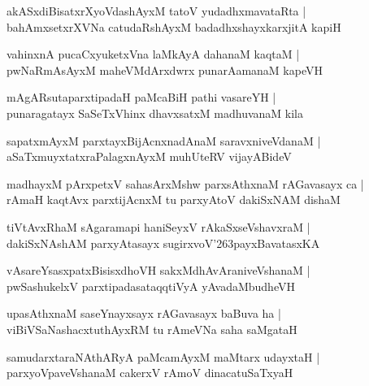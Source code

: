 \documentclass[twoside,12pt,openright]{book}
\def\S{\char'263}
\newcounter{shloka}[chapter]
\begin{document}
\begin{shloka}%
akASxdiBisatxrXyoVdashAyxM tatoV yudadhxmavataRta |\\
bahAmxsetxrXVNa catudaRshAyxM badadhxshayxkarxjitA kapiH 
\end{shloka}

\begin{shloka}%
vahinxnA pucaCxyuketxVna laMkAyA dahanaM kaqtaM |\\
pwNaRmAsAyxM maheVMdArxdwrx punarAamanaM kapeVH 
\end{shloka}

\begin{shloka}%
mAgARsutaparxtipadaH paMcaBiH pathi vasareYH |\\
punaragatayx SaSeTxVhinx dhavxsatxM madhuvanaM kila 
\end{shloka}

\begin{shloka}%
sapatxmAyxM parxtayxBijAcnxnadAnaM saravxniveVdanaM |\\
aSaTxmuyxtatxraPalagxnAyxM muhUteRV vijayABideV 
\end{shloka}

\begin{shloka}%
madhayxM pArxpetxV sahasArxMshw parxsAthxnaM rAGavasayx ca |\\
rAmaH kaqtAvx parxtijAcnxM tu parxyAtoV dakiSxNAM dishaM 
\end{shloka}

\begin{shloka}%
tiVtAvxRhaM sAgaramapi haniSeyxV rAkaSxseVshavxraM |\\
dakiSxNAshAM parxyAtasayx sugirxvoV\S payxBavatasxKA
\end{shloka}

\begin{shloka}%
vAsareYsasxpatxBisisxdhoVH sakxMdhAvAraniveVshanaM |\\
pwSashukelxV parxtipadasataqqtiVyA yAvadaMbudheVH 
\end{shloka}

\begin{shloka}%
upasAthxnaM saseYnayxsayx rAGavasayx baBuva ha |\\
viBiVSaNashacxtuthAyxRM tu rAmeVNa saha saMgataH
\end{shloka}

\begin{shloka}%
samudarxtaraNAthARyA paMcamAyxM maMtarx udayxtaH |\\
parxyoVpaveVshanaM cakerxV rAmoV dinacatuSaTxyaH 
\end{shloka}
\end{document}
